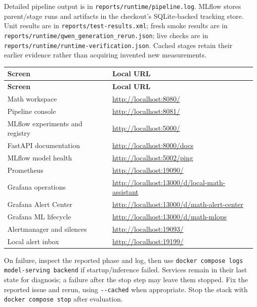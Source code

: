 \documentclass[11pt,a4paper]{article}
\begin{document}
Detailed pipeline output is in \texttt{reports/\allowbreak{}runtime/\allowbreak{}pipeline.\allowbreak{}log}. MLflow stores parent/stage runs and artifacts in the checkout's SQLite-backed tracking store. Unit results are in \texttt{reports/\allowbreak{}test-\allowbreak{}results.\allowbreak{}xml}; fresh smoke results are in \texttt{reports/\allowbreak{}runtime/\allowbreak{}qwen\_\allowbreak{}generation\_\allowbreak{}rerun.\allowbreak{}json}; live checks are in \texttt{reports/\allowbreak{}runtime/\allowbreak{}runtime-\allowbreak{}verification.\allowbreak{}json}. Cached stages retain their earlier evidence rather than acquiring invented new measurements.

\begingroup\small
\begin{longtable}{@{}>{\raggedright\arraybackslash}p{0.5000\dimexpr\textwidth-12pt\relax}>{\raggedright\arraybackslash}p{0.5000\dimexpr\textwidth-12pt\relax}@{}}
\toprule
\textbf{Screen} & \textbf{Local URL} \\
\midrule
\endfirsthead
\textbf{Screen} & \textbf{Local URL} \\
\midrule
\endhead
Math workspace & \url{http://localhost:8080/} \\
Pipeline console & \url{http://localhost:8081/} \\
MLflow experiments and registry & \url{http://localhost:5000/} \\
FastAPI documentation & \url{http://localhost:8000/docs} \\
MLflow model health & \url{http://localhost:5002/ping} \\
Prometheus & \url{http://localhost:19090/} \\
Grafana operations & \url{http://localhost:13000/d/local-math-assistant} \\
Grafana Alert Center & \url{http://localhost:13000/d/math-alert-center} \\
Grafana ML lifecycle & \url{http://localhost:13000/d/math-mlops} \\
Alertmanager and silences & \url{http://localhost:19093/} \\
Local alert inbox & \url{http://localhost:19199/} \\
\bottomrule
\end{longtable}
\endgroup
On failure, inspect the reported phase and log, then use \texttt{docker compose logs model-\allowbreak{}serving backend} if startup/inference failed. Services remain in their last state for diagnosis; a failure after the stop step may leave them stopped. Fix the reported issue and rerun, using \texttt{-\allowbreak{}-\allowbreak{}cached} when appropriate. Stop the stack with \texttt{docker compose stop} after evaluation.
\end{document}

